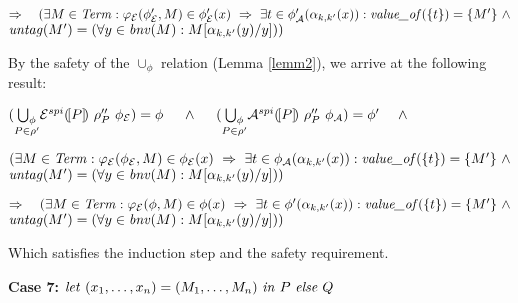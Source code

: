 \documentclass[10pt,a4paper,final,oneside,fleqn]{book}
\begin{document}
\noindent
$\Rightarrow~~~(\exists M\in\mbox{{\itshape Term\/}}:\varphi_\mathcal{E}(\phi'_\mathcal{E},M)\in\phi'_\mathcal{E}(x)~\Rightarrow~\exists t\in\phi'_\mathcal{A}(\alpha_{k,k'}(x)): \mbox{{\itshape value\_of\/}}(\{t\})=\{M'\}~\wedge$\\
$\mbox{{\itshape untag\/}}(M')=(\forall y\in\mbox{{\itshape bnv\/}}(M):M[\alpha_{k,k'}(y)/y]))$\vspace{5mm}

\noindent
By the safety of the $\cup_\phi$ relation (Lemma \ref{lemm2}), we arrive at the following result:

\noindent
$(\underset{P\in\rho'}{\bigcup_\phi}\mathcal{E}^{spi}(\![P]\!)~\rho''_P~\phi_{\mathcal{E}})=\phi~~~~\wedge~~~~(\underset{P\in\rho'}{\bigcup_\phi}\mathcal{A}^{spi}(\![P]\!)~\rho''_P~\phi_{\mathcal{A}})=\phi'~~~~\wedge\vspace{3mm}$

$(\exists M\in\mbox{{\itshape Term\/}}:\varphi_\mathcal{E}(\phi_\mathcal{E},M)\in\phi_\mathcal{E}(x)~\Rightarrow~\exists t\in\phi_\mathcal{A}(\alpha_{k,k'}(x)):\mbox{{\itshape value\_of\/}}(\{t\})=\{M'\}~\wedge$\\
$\mbox{{\itshape untag\/}}(M')=(\forall y\in\mbox{{\itshape bnv\/}}(M):M[\alpha_{k,k'}(y)/y]))$\vspace{5mm}

\noindent
$\Rightarrow~~~(\exists M\in\mbox{{\itshape Term\/}}:\varphi_\mathcal{E}(\phi,M)\in\phi(x)~\Rightarrow~\exists t\in\phi'(\alpha_{k,k'}(x)): \mbox{{\itshape value\_of\/}}(\{t\})=\{M'\}~\wedge$\\
$\mbox{{\itshape untag\/}}(M')=(\forall y\in\mbox{{\itshape bnv\/}}(M):M[\alpha_{k,k'}(y)/y]))$\vspace{10mm}

\noindent
Which satisfies the induction step and the safety requirement.\vspace{5mm}

\noindent
{\bf Case 7:} $\mbox{{\itshape let\/} }(x_1,\ldots,x_n)=(M_1,\ldots,M_n)\mbox{ {\itshape in\/} }P\mbox{ {\itshape else\/} }Q$
\end{document}
